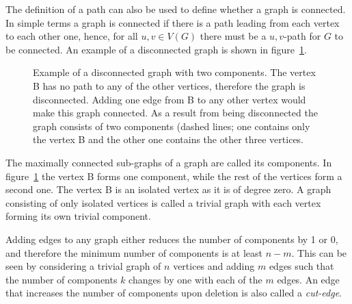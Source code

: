 The definition of a path can also be used to define whether a graph is
connected. In simple terms a graph is connected if there is a path leading from
each vertex to each other one, hence, for all $u,v\in V(G)$ there must be a
$u,v$-path for $G$ to be connected. An example of a disconnected graph is shown
in figure~\ref{fig:disconnectedgraph}.
%
\begin{figure}[htb]
    \centering
    \caption{Example of a disconnected graph with two components. The vertex B
    has no path to any of the other vertices, therefore the graph is
    disconnected. Adding one edge from B to any other vertex would make this
    graph connected. As a result from being disconnected the graph consists of
    two components (dashed lines; one contains only the vertex B and the other
    one contains the other three vertices.} \label{fig:disconnectedgraph}
\end{figure}
%
The maximally connected sub-graphs of a graph are called its components. In
figure~\ref{fig:disconnectedgraph} the vertex B forms one component, while the
rest of the vertices form a second one. The vertex B is an isolated vertex as
it is of degree zero. A graph consisting of only isolated vertices is called a
trivial graph with each vertex forming its own trivial component.

Adding edges to any graph either reduces the number of components by 1 or 0,
and therefore the minimum number of components is at least $n-m$. This can be
seen by considering a trivial graph of $n$ vertices and adding $m$ edges such
that the number of components $k$ changes by one with each of the $m$ edges. An
edge that increases the number of components upon deletion is also called a
\textit{cut-edge}.

